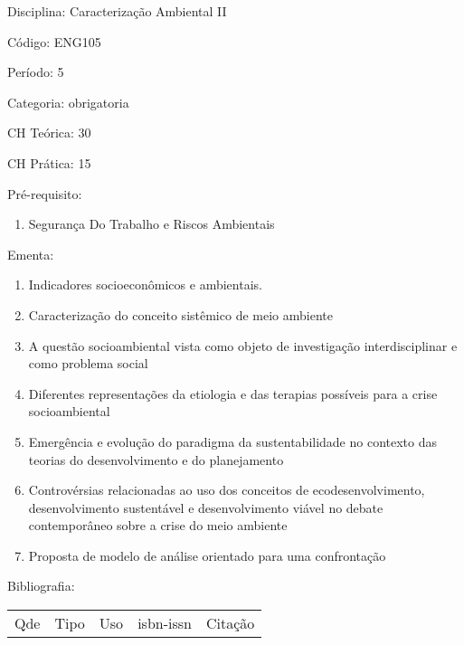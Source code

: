 \documentclass[12pt,a4paper,twoside]{report}
\begin{document}
Disciplina: Caracterização Ambiental II

Código: ENG105

Período: 5

Categoria: obrigatoria

CH Teórica: 30

CH Prática: 15




Pré-requisito:
\begin{enumerate}
\item Segurança Do Trabalho e Riscos Ambientais
\end{enumerate}

Ementa:
\begin{enumerate}
\item Indicadores socioeconômicos e ambientais.
\item Caracterização do conceito sistêmico de meio ambiente
\item A questão socioambiental vista como objeto de investigação interdisciplinar e como problema social
\item Diferentes representações da etiologia e das terapias possíveis para a crise socioambiental
\item Emergência e evolução do paradigma da sustentabilidade no contexto das teorias do desenvolvimento e do planejamento
\item Controvérsias relacionadas ao uso dos conceitos de ecodesenvolvimento, desenvolvimento sustentável e desenvolvimento viável no debate contemporâneo sobre a crise do meio ambiente
\item Proposta de modelo de análise orientado para uma confrontação
\end{enumerate}



Bibliografia:


\begin{tabular}{llllp{8cm}}
Qde & Tipo & Uso & isbn-issn & Citação \\
\end{tabular}
\end{document}
